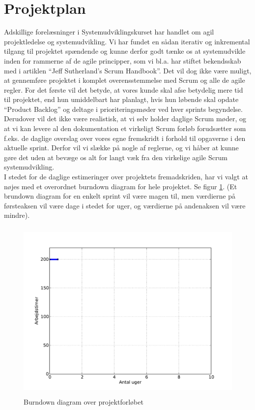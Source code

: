 \documentclass[12pt]{article}   %
\begin{document}
\section{Projektplan}
Adskillige forelæsninger i Systemudviklingskurset har handlet om agil projektledelse og systemudvikling. Vi har fundet en sådan iterativ og inkremental tilgang til projektet spændende og kunne derfor godt tænke os at systemudvikle inden for rammerne af de agile principper, som vi bl.a. har 
stiftet bekendsskab med i artiklen ``Jeff Sutherland's Scrum
Handbook''\cite{scrum}. Det vil dog ikke være muligt, at gennemføre projektet i komplet overensstemmelse med Scrum og alle de agile regler. For det første vil det betyde, at vores kunde skal afse betydelig mere tid til projektet, end hun umiddelbart har planlagt, hvis hun løbende skal opdate ``Product Backlog'' og deltage i prioriteringsmøder ved hver sprints begyndelse. Derudover vil det ikke være realistisk, at vi selv holder daglige Scrum møder,
og at vi kan levere al den dokumentation et virkeligt Scrum forløb
forudsætter som f.eks. de daglige overslag over vores egne fremskridt i forhold
til opgaverne i den aktuelle sprint. Derfor vil vi slække på nogle af 
reglerne, og vi håber at kunne gøre det uden at bevæge os alt for langt væk fra 
den virkelige agile Scrum systemudvikling.\\
I stedet for de daglige estimeringer over projektets fremadskriden, har vi
valgt at nøjes med et overordnet burndown diagram for hele projektet. Se figur
\ref{fig:bd}. (Et brundown diagram for en enkelt sprint vil være magen til,
men værdierne på førsteaksen vil være dage i stedet for uger, og værdierne på
andenaksen vil være mindre). 

\begin{figure}[!ht]
	\centering
\includegraphics[width=13cm, height=9cm]{burndown.pdf}
\caption{Burndown diagram over projektforløbet}
\label{fig:bd}
\end{figure}
\end{document}
